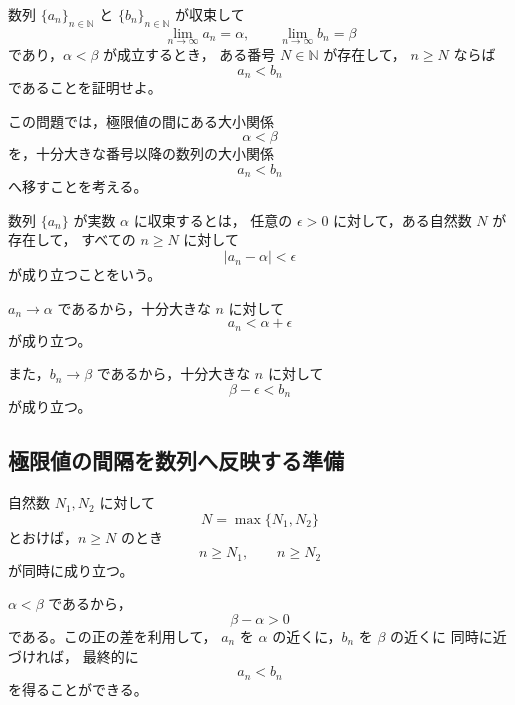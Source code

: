 \begin{exercise}
	数列 $\{a_n\}_{n\in\mathbb{N}}$ と $\{b_n\}_{n\in\mathbb{N}}$ が収束して
	\[
	\lim_{n\to\infty} a_n=\alpha,
	\qquad
	\lim_{n\to\infty} b_n=\beta
	\]
	であり，$\alpha<\beta$ が成立するとき，
	ある番号 $N\in\mathbb{N}$ が存在して，
	$n\geq N$ ならば
	\[
	a_n<b_n
	\]
	であることを証明せよ。
\end{exercise}
\begin{background}
	この問題では，極限値の間にある大小関係
	\[
	\alpha<\beta
	\]
	を，十分大きな番号以降の数列の大小関係
	\[
	a_n<b_n
	\]
	へ移すことを考える。
	
	\begin{definition}[数列の収束]
		数列 $\{a_n\}$ が実数 $\alpha$ に収束するとは，
		任意の $\epsilon>0$ に対して，ある自然数 $N$ が存在して，
		すべての $n\geq N$ に対して
		\[
		|a_n-\alpha|<\epsilon
		\]
		が成り立つことをいう。
	\end{definition}
	
	\begin{remark}
		$a_n\to\alpha$ であるから，十分大きな $n$ に対して
		\[
		a_n<\alpha+\epsilon
		\]
		が成り立つ。
		
		また，$b_n\to\beta$ であるから，十分大きな $n$ に対して
		\[
		\beta-\epsilon<b_n
		\]
		が成り立つ。
	\end{remark}
	
	\subsection{極限値の間隔を数列へ反映する準備}
	
	\begin{lemma}[有限個の条件を同時に満たす番号の取り方]
		自然数 $N_1,N_2$ に対して
		\[
		N=\max\{N_1,N_2\}
		\]
		とおけば，$n\geq N$ のとき
		\[
		n\geq N_1,
		\qquad
		n\geq N_2
		\]
		が同時に成り立つ。
	\end{lemma}
	
	\begin{remark}
		$\alpha<\beta$ であるから，
		\[
		\beta-\alpha>0
		\]
		である。この正の差を利用して，
		$a_n$ を $\alpha$ の近くに，$b_n$ を $\beta$ の近くに
		同時に近づければ，
		最終的に
		\[
		a_n<b_n
		\]
		を得ることができる。
	\end{remark}
\end{background}
